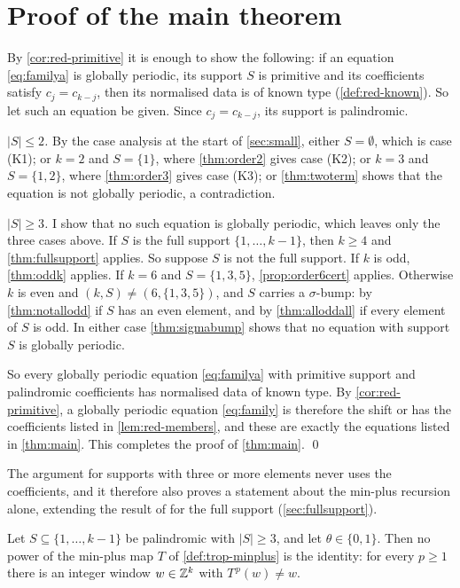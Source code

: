 \section{Proof of the main theorem}
\label{sec:assembly}

By \autoref{cor:red-primitive} it is
enough to show the following: if an equation \eqref{eq:familya} is
globally periodic, its support $S$ is primitive and its coefficients
satisfy $c_j=c_{k-j}$, then its normalised data is of known type
(\autoref{def:red-known}). So let such an equation be given. Since
$c_j=c_{k-j}$, its support is palindromic.

\emph{$|S|\le2$.} By the case analysis at the start of \autoref{sec:small},
either $S=\emptyset$, which is case (K1); or $k=2$ and $S=\{1\}$, where
\autoref{thm:order2} gives case (K2); or $k=3$ and $S=\{1,2\}$, where
\autoref{thm:order3} gives case (K3); or \autoref{thm:twoterm} shows that the
equation is not globally periodic, a contradiction.

\emph{$|S|\ge3$.} I show that no such equation is globally periodic,
which leaves only the three cases above. If $S$ is the full support
$\{1,\dots,k-1\}$, then $k\ge4$ and \autoref{thm:fullsupport} applies. So
suppose $S$ is not the full support. If $k$ is odd, \autoref{thm:oddk}
applies. If $k=6$ and $S=\{1,3,5\}$, \autoref{prop:order6cert} applies.
Otherwise $k$ is even and $(k,S)\ne(6,\{1,3,5\})$, and $S$ carries a
$\sigma$-bump: by \autoref{thm:notallodd} if $S$ has an even element, and
by \autoref{thm:alloddall} if every element of $S$ is odd. In either case
\autoref{thm:sigmabump} shows that no equation with support $S$ is
globally periodic.

So every globally periodic equation \eqref{eq:familya} with primitive support and
palindromic coefficients has normalised data of known type. By
\autoref{cor:red-primitive}, a globally periodic equation \eqref{eq:family} is
therefore the shift or has the coefficients listed in \autoref{lem:red-members},
and these are exactly the equations listed in \autoref{thm:main}. This completes
the proof of \autoref{thm:main}. \qed

The argument for supports with three or more elements never uses the
coefficients, and it therefore also proves a statement about the min-plus
recursion alone, extending the result of \citet{CsornyeiLaczkovich2001} for the
full support (\autoref{sec:fullsupport}).

\begin{corollary}
\label{cor:trop-nonperiodic}
Let $S\subseteq\{1,\dots,k-1\}$ be palindromic with $|S|\ge3$, and let
$\theta\in\{0,1\}$. Then no power of the min-plus map $T$ of
\autoref{def:trop-minplus} is the identity: for every $p\ge1$ there is an
integer window $w\in\mathbb{Z}^k$ with $T^{\,p}(w)\ne w$.
\end{corollary}

